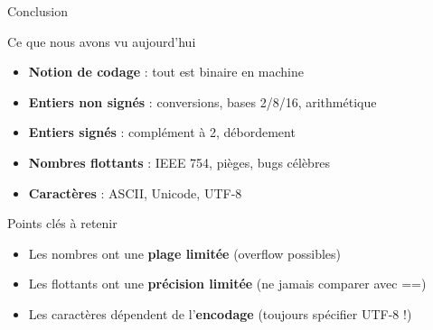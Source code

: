\documentclass[aspectratio=1610]{beamer}
\begin{document}
\begin{frame}{Conclusion}

  \begin{block}{Ce que nous avons vu aujourd'hui}
    \begin{itemize}
      \item \textbf{Notion de codage} : tout est binaire en machine
      \item \textbf{Entiers non signés} : conversions, bases 2/8/16, arithmétique
      \item \textbf{Entiers signés} : complément à 2, débordement
      \item \textbf{Nombres flottants} : IEEE 754, pièges, bugs célèbres
      \item \textbf{Caractères} : ASCII, Unicode, UTF-8
    \end{itemize}
  \end{block}


  \begin{alertblock}{ Points clés à retenir}
    \begin{itemize}
      \item Les nombres ont une \textbf{plage limitée} (overflow possibles)
      \item Les flottants ont une \textbf{précision limitée} (ne jamais comparer avec ==)
      \item Les caractères dépendent de l'\textbf{encodage} (toujours spécifier UTF-8 !)
    \end{itemize}
  \end{alertblock}



\end{frame}
\end{document}
